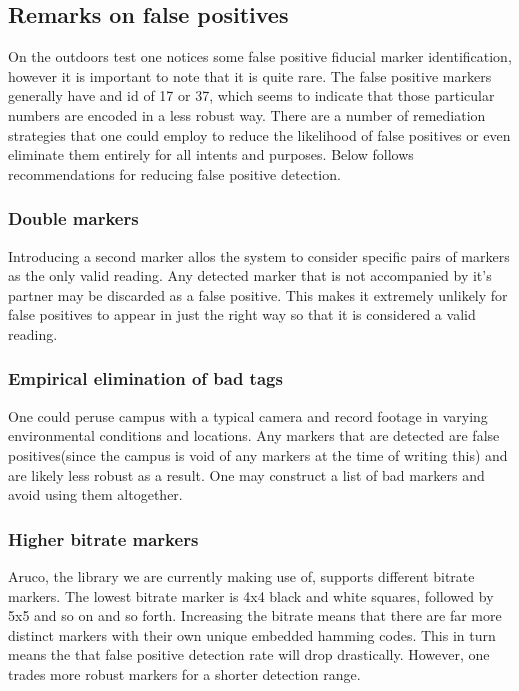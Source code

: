 \subsection{Remarks on false positives}
On the outdoors test one notices some false positive fiducial marker identification, however it is important to note that it is quite rare. The false positive markers generally have and id of 17 or 37, which seems to indicate that those particular numbers are encoded in a less robust way. There are a number of remediation strategies that one could employ to reduce the likelihood of false positives or even eliminate them entirely for all intents and purposes. Below follows recommendations for reducing false positive detection.
\subsubsection{Double markers}
Introducing a second marker allos the system to consider specific pairs of markers as the only valid reading. Any detected marker that is not accompanied by it's partner may be discarded as a false positive. This makes it extremely unlikely for false positives to appear in just the right way so that it is considered a valid reading.
\subsubsection{Empirical elimination of bad tags}
One could peruse campus with a typical camera and record footage in varying environmental conditions and locations. Any markers that are detected are false positives(since the campus is void of any markers at the time of writing this) and are likely less robust as a result. One may construct a list of bad markers and avoid using them altogether.
\subsubsection{Higher bitrate markers}
Aruco, the library we are currently making use of, supports different bitrate markers. The lowest bitrate marker is 4x4 black and white squares, followed by 5x5 and so on and so forth. Increasing the bitrate means that there are far more distinct markers with their own unique embedded hamming codes. This in turn means the that false positive detection rate will drop drastically. However, one trades more robust markers for a shorter detection range.
